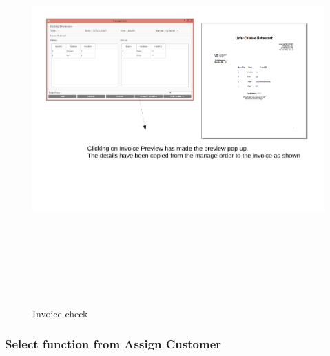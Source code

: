 \begin{landscape}
\begin{figure}[H]
    \includegraphics[height = 15cm]{./Testing/images/Test7.pdf}
    \caption{Invoice check} \label{fig:Test7}
\end{figure}

\subsubsection{Select function from Assign Customer}


\end{landscape}

